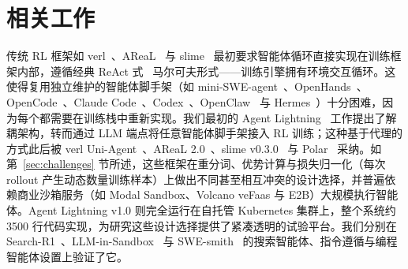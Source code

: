 \section{相关工作}

传统 RL 框架如 verl~\cite{hybridflow}、AReaL~\cite{areal} 与 slime~\cite{slime} 最初要求智能体循环直接实现在训练框架内部，遵循经典 ReAct 式~\cite{react} 马尔可夫形式——训练引擎拥有环境交互循环。这使得复用独立维护的智能体脚手架（如 mini-SWE-agent~\cite{minisweagent}、OpenHands~\cite{openhands}、OpenCode~\cite{opencode}、Claude Code~\cite{claudecode}、Codex~\cite{codex}、OpenClaw~\cite{openclaw} 与 Hermes~\cite{hermes}）十分困难，因为每个都需要在训练栈中重新实现。我们最初的 Agent Lightning~\cite{agentlightning} 工作提出了解耦架构，转而通过 LLM 端点将任意智能体脚手架接入 RL 训练；这种基于代理的方式此后被 verl Uni-Agent~\cite{uniagent}、AReaL 2.0~\cite{areal2}、slime v0.3.0~\cite{slime} 与 Polar~\cite{polar} 采纳。如第~\ref{sec:challenges} 节所述，这些框架在重分词、优势计算与损失归一化（每次 rollout 产生动态数量训练样本）上做出不同甚至相互冲突的设计选择，并普遍依赖商业沙箱服务（如 Modal Sandbox、Volcano veFaas 与 E2B）大规模执行智能体。Agent Lightning v1.0 则完全运行在自托管 Kubernetes 集群上，整个系统约 3500 行代码实现，为研究这些设计选择提供了紧凑透明的试验平台。我们分别在 Search-R1~\cite{searchr1}、LLM-in-Sandbox~\cite{llminsandbox} 与 SWE-smith~\cite{swesmith} 的搜索智能体、指令遵循与编程智能体设置上验证了它。
